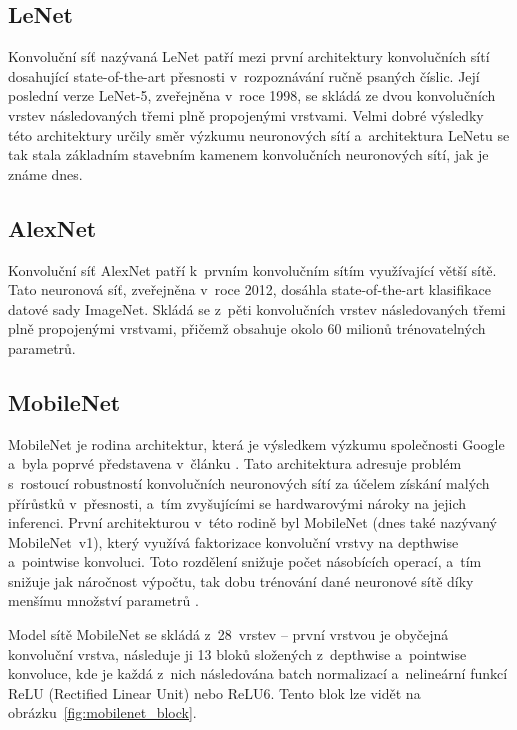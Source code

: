 \subsection{LeNet}

Konvoluční síť nazývaná LeNet \cite{726791} patří mezi první architektury konvolučních sítí dosahující state-of-the-art přesnosti v~rozpoznávání ručně psaných číslic. Její poslední verze LeNet-5, zveřejněna v~roce 1998, se skládá ze dvou konvolučních vrstev následovaných třemi plně propojenými vrstvami. Velmi dobré výsledky této architektury určily směr výzkumu neuronových sítí a~architektura LeNetu se tak stala základním stavebním kamenem konvolučních neuronových sítí, jak je známe dnes.

\subsection{AlexNet}

Konvoluční síť AlexNet \cite{NIPS2012_c399862d} patří k~prvním konvolučním sítím využívající větší  sítě. Tato neuronová síť, zveřejněna v~roce 2012, dosáhla state-of-the-art klasifikace datové sady ImageNet. Skládá se z~pěti konvolučních vrstev následovaných třemi plně propojenými vrstvami, přičemž obsahuje okolo 60 milionů trénovatelných parametrů. 

\subsection{MobileNet}

MobileNet je rodina architektur, která je výsledkem výzkumu společnosti Google a~byla poprvé představena v~článku \cite{howard2017mobilenets}. Tato architektura adresuje problém s~rostoucí robustností konvolučních neuronových sítí za účelem získání malých přírůstků v~přesnosti, a~tím zvyšujícími se hardwarovými nároky na jejich inferenci. První architekturou v~této rodině byl MobileNet \cite{howard2017mobilenets} (dnes také nazývaný MobileNet~v1), který využívá faktorizace konvoluční vrstvy na depthwise a~pointwise konvoluci. Toto rozdělení snižuje počet násobících operací, a~tím snižuje jak náročnost výpočtu, tak dobu trénování dané neuronové sítě díky menšímu množství parametrů .

Model sítě MobileNet se skládá z~28~vrstev -- první vrstvou je obyčejná konvoluční vrstva, následuje ji 13 bloků složených z~depthwise a~pointwise konvoluce, kde je každá z~nich následována batch normalizací a~nelineární funkcí ReLU (Rectified Linear Unit) nebo ReLU6. Tento blok lze vidět na obrázku~\ref{fig:mobilenet_block}.


